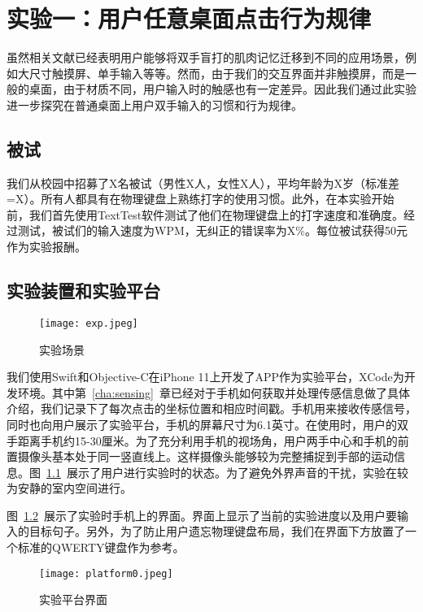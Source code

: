 \chapter{实验一：用户任意桌面点击行为规律}
虽然相关文献已经表明用户能够将双手盲打的肌肉记忆迁移到不同的应用场景，例如大尺寸触摸屏、单手输入等等。然而，由于我们的交互界面并非触摸屏，而是一般的桌面，由于材质不同，用户输入时的触感也有一定差异。因此我们通过此实验进一步探究在普通桌面上用户双手输入的习惯和行为规律。

\label{cha:exp1}
\section{被试}
我们从校园中招募了X名被试（男性X人，女性X人），平均年龄为X岁（标准差=X）。所有人都具有在物理键盘上熟练打字的使用习惯。此外，在本实验开始前，我们首先使用TextTest软件\cite{texttest}\cite{wobbrock2006analyzing}测试了他们在物理键盘上的打字速度和准确度。经过测试，被试们的输入速度为WPM，无纠正的错误率为X\%。每位被试获得50元作为实验报酬。

\section{实验装置和实验平台}
\begin{figure}[h] %
    \centering
    \texttt{[image: exp.jpeg]}
    \caption{实验场景}
    \label{fig:exp}
\end{figure}
我们使用Swift和Objective-C在iPhone 11上开发了APP作为实验平台，XCode为开发环境。其中第~\ref{cha:sensing}~章已经对于手机如何获取并处理传感信息做了具体介绍，我们记录下了每次点击的坐标位置和相应时间戳。手机用来接收传感信号，同时也向用户展示了实验平台，手机的屏幕尺寸为6.1英寸。在使用时，用户的双手距离手机约15-30厘米。为了充分利用手机的视场角，用户两手中心和手机的前置摄像头基本处于同一竖直线上。这样摄像头能够较为完整捕捉到手部的运动信息。图~\ref{fig:exp}~展示了用户进行实验时的状态。为了避免外界声音的干扰，实验在较为安静的室内空间进行。

图~\ref{fig:platform0}~展示了实验时手机上的界面。界面上显示了当前的实验进度以及用户要输入的目标句子。另外，为了防止用户遗忘物理键盘布局，我们在界面下方放置了一个标准的QWERTY键盘作为参考。

\begin{figure}[h] %
    \centering
    \texttt{[image: platform0.jpeg]}
    \caption{实验平台界面}
    \label{fig:platform0}
\end{figure}

